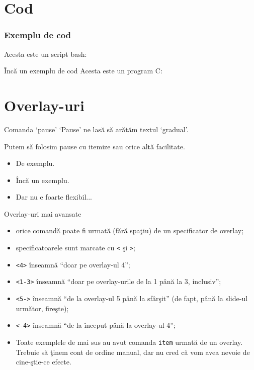 \documentclass{beamer}
\begin{document}
\section{Cod}
\frame{\tableofcontents[currentsection]}

\begin{frame}
\frametitle{Exemplu de cod}
Acesta este un script bash:\\
\end{frame}

\begin{frame}{Încă un exemplu de cod}
Acesta este un program C:


\end{frame}

\section{Overlay-uri}
\frame{\tableofcontents[currentsection]}

\begin{frame}{Comanda `pause'}
`Pause' ne lasă să arătăm textul `gradual'.

\pause Putem să folosim pause cu itemize sau orice altă facilitate.
\begin{itemize}
\pause \item De exemplu.
\pause \item Încă un exemplu.
\pause \item Dar nu e foarte flexibil...
\end{itemize}
\end{frame}

\begin{frame}{Overlay-uri mai avansate}
\begin{itemize}
\item<3-> orice comandă poate fi urmată (fără spaţiu) de un specificator de
overlay;
\item<4-> specificatoarele sunt marcate cu \texttt{<} şi \texttt{>};
\item<5-> \texttt{<4>} înseamnă ``doar pe overlay-ul 4'';
\item<5-> \texttt{<1-3>} înseamnă ``doar pe overlay-urile de la 1 până la 3,
inclusiv'';
\item<6-> \texttt{<5->} înseamnă ``de la overlay-ul 5 până la sfârşit'' (de
fapt, până la slide-ul următor, fireşte);
\item<6-> \texttt{<-4>} înseamnă ``de la început până la overlay-ul 4'';
\item<7-> Toate exemplele de mai sus au avut comanda \texttt{item} urmată de
un overlay. Trebuie să ţinem cont de ordine manual, dar nu cred că vom avea
nevoie de cine-ştie-ce efecte.
\end{itemize}
\end{frame}
\end{document}
